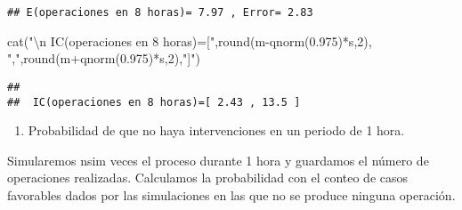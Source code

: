 \documentclass[
]{book}
\newenvironment{Shaded}{\begin{snugshade}}{\end{snugshade}}
\newcommand{\DecValTok}[1]{\textcolor[rgb]{0.00,0.00,0.81}{#1}}
\newcommand{\FloatTok}[1]{\textcolor[rgb]{0.00,0.00,0.81}{#1}}
\newcommand{\FunctionTok}[1]{\textcolor[rgb]{0.00,0.00,0.00}{#1}}
\newcommand{\NormalTok}[1]{#1}
\newcommand{\SpecialCharTok}[1]{\textcolor[rgb]{0.00,0.00,0.00}{#1}}
\newcommand{\StringTok}[1]{\textcolor[rgb]{0.31,0.60,0.02}{#1}}
\providecommand{\tightlist}{%
  \setlength{\itemsep}{0pt}\setlength{\parskip}{0pt}}
\theoremstyle{definition}
\theoremstyle{definition}
\theoremstyle{definition}
\theoremstyle{definition}
\theoremstyle{remark}
\begin{document}
\begin{verbatim}
## E(operaciones en 8 horas)= 7.97 , Error= 2.83
\end{verbatim}

\begin{Shaded}
\begin{Highlighting}[]
\FunctionTok{cat}\NormalTok{(}\StringTok{"}\SpecialCharTok{\textbackslash{}n}\StringTok{ IC(operaciones en 8 horas)=["}\NormalTok{,}\FunctionTok{round}\NormalTok{(m}\SpecialCharTok{{-}}\FunctionTok{qnorm}\NormalTok{(}\FloatTok{0.975}\NormalTok{)}\SpecialCharTok{*}\NormalTok{s,}\DecValTok{2}\NormalTok{),}
    \StringTok{","}\NormalTok{,}\FunctionTok{round}\NormalTok{(m}\SpecialCharTok{+}\FunctionTok{qnorm}\NormalTok{(}\FloatTok{0.975}\NormalTok{)}\SpecialCharTok{*}\NormalTok{s,}\DecValTok{2}\NormalTok{),}\StringTok{"]"}\NormalTok{)}
\end{Highlighting}
\end{Shaded}

\begin{verbatim}
## 
##  IC(operaciones en 8 horas)=[ 2.43 , 13.5 ]
\end{verbatim}

\begin{enumerate}
\def\labelenumi{\arabic{enumi}.}
\setcounter{enumi}{1}
\tightlist
\item
  Probabilidad de que no haya intervenciones en un periodo de 1 hora.
\end{enumerate}

Simularemos nsim veces el proceso durante 1 hora y guardamos el número de operaciones realizadas. Calculamos la probabilidad con el conteo de casos favorables dados por las simulaciones en las que no se produce ninguna operación.
\end{document}
